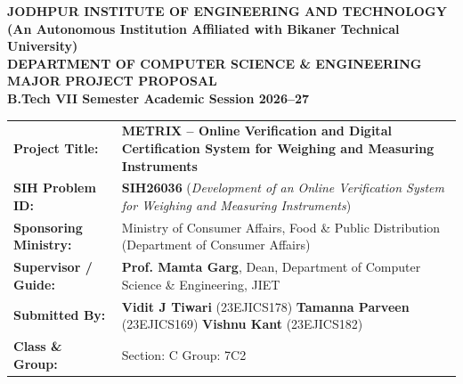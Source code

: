 \documentclass[11pt,a4paper]{article}
\begin{document}
\begin{tcolorbox}[
    enhanced,
    colback=lightslate,
    colframe=primarynavy,
    arc=3mm,
    boxrule=1.5pt,
    center,
    width=\textwidth,
    top=12pt,
    bottom=12pt
]
    \centering
    {\LARGE \textbf{\color{primarynavy}JODHPUR INSTITUTE OF ENGINEERING AND TECHNOLOGY}}\\[0.2cm]
    {\large \textbf{\color{darkslate}(An Autonomous Institution Affiliated with Bikaner Technical University)}}\\[0.15cm]
    {\normalsize \textbf{\color{accentblue}DEPARTMENT OF COMPUTER SCIENCE \& ENGINEERING}}\\[0.35cm]
    {\Large \textbf{\color{primarynavy}MAJOR PROJECT PROPOSAL}}\\[0.1cm]
    {\normalsize \textbf{B.Tech VII Semester \textbar{} Academic Session 2026--27}}
\end{tcolorbox}

\vspace{0.2cm}

\begin{tcolorbox}[
    enhanced,
    colback=white,
    colframe=bordergray,
    boxrule=1pt,
    arc=2mm,
    top=8pt,
    bottom=8pt
]
\renewcommand{\arraystretch}{1.25}
\begin{tabularx}{\textwidth}{@{}p{3.8cm}X@{}}
    \textbf{\color{primarynavy}Project Title:} & \textbf{\large METRIX -- Online Verification and Digital Certification System for Weighing and Measuring Instruments} \\
    \textbf{\color{primarynavy}SIH Problem ID:} & \textbf{SIH26036} (\textit{Development of an Online Verification System for Weighing and Measuring Instruments}) \\
    \textbf{\color{primarynavy}Sponsoring Ministry:} & Ministry of Consumer Affairs, Food \& Public Distribution (Department of Consumer Affairs) \\
    \textbf{\color{primarynavy}Supervisor / Guide:} & \textbf{Prof. Mamta Garg}, Dean, Department of Computer Science \& Engineering, JIET \\
    \textbf{\color{primarynavy}Submitted By:} & \textbf{Vidit J Tiwari} (23EJICS178) \textbar{} \textbf{Tamanna Parveen} (23EJICS169) \textbar{} \textbf{Vishnu Kant} (23EJICS182) \\
    \textbf{\color{primarynavy}Class \& Group:} & Section: C \textbar{} Group: 7C2 \\
\end{tabularx}
\end{tcolorbox}
\end{document}
